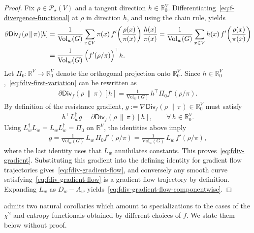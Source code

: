 \documentclass[11pt,a4paper]{article}
\newcommand{\Div}{\mathsf{Div}}
\newcommand{\Prob}{\mathscr{P}}
\newcommand{\Vol}{\mathrm{Vol}}
\begin{document}
\begin{proof}
    Fix $\rho\in\Prob_\star(V)$ and a tangent direction $h\in\mathbb{R}^V_0$. Differentiating~\cref{eq:f-divergence-functional} at $\rho$ in direction $h$, and using the chain rule, yields
        \begin{align}\label{eq:fdiv-first-variation}
            \partial\Div_f(\rho\,\|\,\pi)[h]
            &= \frac{1}{\Vol_w(G)}\sum_{x\in V}\pi(x)\,f'\!\left(\frac{\rho(x)}{\pi(x)}\right)\frac{h(x)}{\pi(x)}
            = \frac{1}{\Vol_w(G)}\sum_{x\in V} h(x)\, f'\!\left(\frac{\rho(x)}{\pi(x)}\right) \notag\\
            &= \frac{1}{\Vol_w(G)}\, \Bigl(f'(\rho/\pi)\Bigr)^\top h.
        \end{align}
    Let $\Pi_0:\mathbb{R}^V\to\mathbb{R}^V_0$ denote the orthogonal projection onto $\mathbb{R}^{V}_0$. Since $h\in\mathbb{R}^V_0$,~\cref{eq:fdiv-first-variation} can be rewritten as
        \begin{align*}
            \partial\Div_f(\rho\,\|\,\pi)[h]
            = \frac{1}{\Vol_w(G)}\, h^\top \Pi_0 f'(\rho/\pi).
        \end{align*}
    By definition of the resistance gradient, $g:=\nabla \Div_f(\rho\,\|\,\pi)\in\mathbb{R}^V_0$ must satisfy
        \begin{align}\label{eq:fdiv-gradient-identification}
            h^\top L_w^\dagger g = \partial\Div_f(\rho\,\|\,\pi)[h],\qquad \forall\,h\in\mathbb{R}^V_0.
        \end{align}
    Using $L_w^\dagger L_w = L_w L_w^\dagger = \Pi_0$ on $\mathbb{R}^V$, the identities above imply
        \begin{align*}
            g = \frac{1}{\Vol_w(G)}\, L_w\,\Pi_0 f'\!\left(\rho/\pi\right)
            = \frac{1}{\Vol_w(G)}\, L_w\, f'\!\left(\rho/\pi\right),
        \end{align*}
    where the last identity uses that $L_w$ annihilates constants. This proves~\cref{eq:fdiv-gradient}. Substituting this gradient into the defining identity for gradient flow trajectories gives~\cref{eq:fdiv-gradient-flow}, and conversely any smooth curve satisfying~\cref{eq:fdiv-gradient-flow} is a gradient flow trajectory by definition. Expanding $L_w$ as $D_w-A_w$ yields~\cref{eq:fdiv-gradient-flow-componentwise}.
\end{proof}

 admits two natural corollaries which amount to specializations to the cases of the $\chi^2$ and entropy functionals obtained by different choices of $f$. We state them below without proof.
\end{document}
